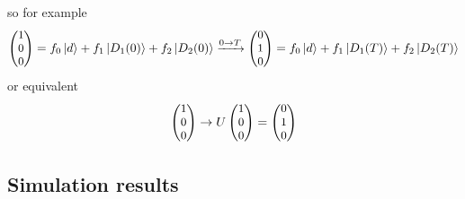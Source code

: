 \documentclass[t]{beamer}
\begin{document}
\begin{frame}
so for example
\begin{equation}\small
\begin{pmatrix}
1\\
0\\
0
\end{pmatrix}
= f_0 \ket{d} + f_1\ket{D_1(0)} + f_2\ket{D_2(0)} \xrightarrow{0\rightarrow T} \begin{pmatrix}
0\\
1\\
0
\end{pmatrix}
= f_0 \ket{d} + f_1\ket{D_1(T)} + f_2\ket{D_2(T)}
\end{equation}
or equivalent 
\begin{equation}\small
\begin{pmatrix}
1\\
0\\
0
\end{pmatrix}
\rightarrow U\begin{pmatrix}
1\\
0\\
0
\end{pmatrix}
= 
\begin{pmatrix}
0\\
1\\
0
\end{pmatrix}
\end{equation}

\end{frame}


\subsection{Simulation results}
\begin{frame}{}
\tableofcontents[ 
currentsubsection, 
hideothersubsections, 
sectionstyle=show/shaded, 
subsectionstyle=show/shaded, 
] 


\end{frame}
\end{document}
